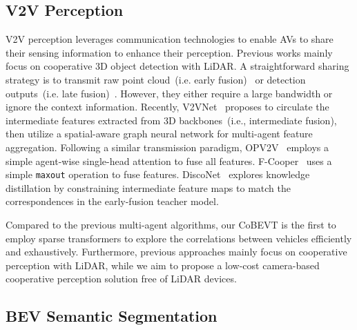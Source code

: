 \documentclass{article}
\begin{document}
\subsection{V2V Perception}
V2V perception leverages communication technologies to enable AVs to share their sensing information to enhance their perception.
%
Previous works mainly focus on cooperative 3D object detection with LiDAR.
%
A straightforward sharing strategy is to transmit raw point cloud~(i.e. early fusion)~\cite{chen2019cooper} or detection outputs~(i.e. late fusion)~\cite{rawashdeh2018collaborative}. 
%
However, they either require a large bandwidth or ignore the context information.
%
Recently, V2VNet~\cite{wang2020v2vnet} proposes to circulate the intermediate features extracted from 3D backbones~(i.e., intermediate fusion), then utilize a spatial-aware graph neural network for multi-agent feature aggregation.
%
Following a similar transmission paradigm, OPV2V~\cite{xu2021opv2v} employs a simple agent-wise single-head attention to fuse all features.
%
F-Cooper~\cite{chen2019f} uses a simple \texttt{maxout} operation to fuse features.
%
DiscoNet~\cite{li2021learning} explores knowledge distillation by constraining intermediate feature maps to match the correspondences in the early-fusion teacher model.
%
%

Compared to the previous multi-agent algorithms, our CoBEVT is the first to employ sparse transformers to explore the correlations between vehicles efficiently and exhaustively. Furthermore, previous approaches mainly focus on cooperative perception with LiDAR, while we aim to propose a low-cost camera-based cooperative perception solution free of LiDAR devices.


\subsection{BEV Semantic Segmentation}
\end{document}
